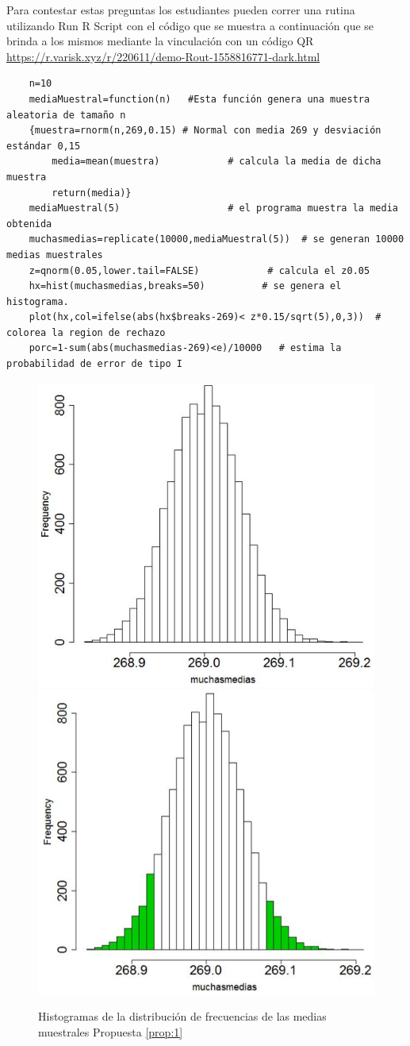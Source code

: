 \documentclass[oneside,spanish]{amsart}
\numberwithin{equation}{section}
\theoremstyle{definition}
\begin{document}
Para contestar estas preguntas los estudiantes pueden correr una rutina utilizando Run R Script con el código que se muestra a continuación que se brinda a los mismos mediante la vinculación con un código QR \url{https://r.varisk.xyz/r/220611/demo-Rout-1558816771-dark.html}

\begin{lstlisting}
	n=10
	mediaMuestral=function(n)   #Esta función genera una muestra aleatoria de tamaño n 
	{muestra=rnorm(n,269,0.15) # Normal con media 269 y desviación estándar 0,15
		media=mean(muestra)            # calcula la media de dicha muestra
		return(media)}
	mediaMuestral(5)                   # el programa muestra la media obtenida
	muchasmedias=replicate(10000,mediaMuestral(5))  # se generan 10000 medias muestrales                                                                       
	z=qnorm(0.05,lower.tail=FALSE)            # calcula el z0.05             
	hx=hist(muchasmedias,breaks=50)          # se genera el histograma.
	plot(hx,col=ifelse(abs(hx$breaks-269)< z*0.15/sqrt(5),0,3))  # colorea la region de rechazo
	porc=1-sum(abs(muchasmedias-269)<e)/10000   # estima la probabilidad de error de tipo I
\end{lstlisting}

\begin{figure}[h]
	\centering
	\includegraphics[height=0.4\linewidth]{Anexos-06/Imagen5}
	\includegraphics[height=0.4\linewidth]{Anexos-06/Imagen6}
	\caption{Histogramas de la distribución de frecuencias de las medias muestrales Propuesta \ref{prop:1}}
	\label{fig:3}
\end{figure}
\end{document}
